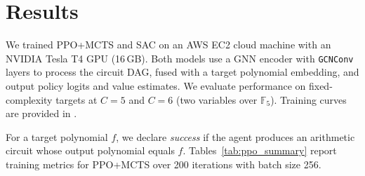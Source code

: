 \documentclass{article} %
\begin{document}









\section{Results}
\label{sec:results}

We trained PPO+MCTS and SAC on an AWS EC2 cloud machine with an NVIDIA Tesla T4 GPU (16\,GB). Both models use a GNN encoder with \texttt{GCNConv} layers to process the circuit DAG, fused with a target polynomial embedding, and output policy logits and value estimates. We evaluate performance on fixed-complexity targets at $C=5$ and $C=6$ (two variables over $\mathbb{F}_5$). Training curves are provided in .

For a target polynomial $f$, we declare \emph{success} if the agent produces an arithmetic circuit whose output polynomial equals $f$. Tables~\ref{tab:ppo_summary} report training metrics for PPO+MCTS over 200 iterations with batch size 256.
\end{document}
